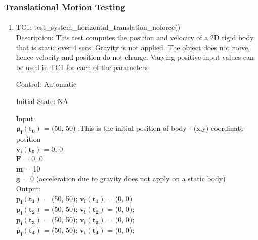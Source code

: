 \documentclass[12pt, titlepage]{article}
\begin{document}
\subsubsection{Translational Motion Testing}
	
\paragraph{}

\begin{enumerate}

\item{TC1: test\_system\_horizontal\_translation\_noforce()\\}
Description: This test computes the position and velocity of a 2D rigid body that is static over 4 secs. Gravity is not applied. The object does not move, hence velocity and position do not change. Varying positive input values can be used in TC1 for each of the parameters

Control: Automatic
					
Initial State: NA
					
Input:\\
      \hspace*{1.3cm} $\mathbf{p_i}$$\mathbf{(t_0)}$ = (50, 50) ;This  is the initial position of body - (x,y) coordinate position\\
       \hspace*{1.3cm}$\mathbf{v_i}$$\mathbf{(t_0)}$ = 0, 0\\
       \hspace*{1.3cm}$\mathbf{F}$$\mathbf{}$ = 0, 0\\
       \hspace*{1.3cm}$\mathbf{m}$$ \mathbf{}$ = 10\\
       \hspace*{1.3cm}$\mathbf{g}$$\mathbf{}$ = 0 (acceleration due to gravity does not apply on a static body)\\			
Output:\\  
	     $\mathbf{p_i}$$\mathbf{(t_1)}$ = (50, 50);
         $\mathbf{v_i}$$\mathbf{(t_1)}$ = (0, 0)\\
         $\mathbf{p_i}$$\mathbf{(t_2)}$ = (50, 50);
         $\mathbf{v_i}$$\mathbf{(t_2)}$ = (0, 0);\\
         $\mathbf{p_i}$$\mathbf{(t_3)}$ = (50, 50);
         $\mathbf{v_i}$$\mathbf{(t_3)}$ = (0, 0);\\
         $\mathbf{p_i}$$\mathbf{(t_4)}$ = (50, 50);
         $\mathbf{v_i}$$\mathbf{(t_4)}$ = (0, 0);\\    
					

\end{enumerate}
\end{document}
